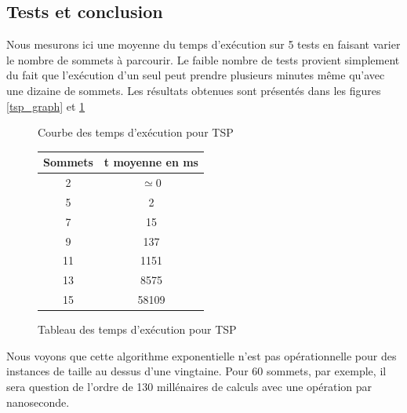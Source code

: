  

\subsection{Tests et conclusion}
Nous mesurons ici une moyenne du temps d'exécution sur 5 tests en faisant varier le nombre de sommets à parcourir. Le faible nombre de tests provient simplement du fait que l'exécution d'un seul peut prendre plusieurs minutes même qu'avec une dizaine de sommets. Les résultats obtenues sont présentés dans les figures \ref{tsp_graph} et \ref{tsp_table}

\begin{figure}[ht]
\begin{minipage}[b]{0.5\linewidth}
\centering
{}
\caption {Courbe des temps d'exécution pour TSP}
\label{tsp_graph}
\end{minipage}
\hspace{0.5cm}
\begin{minipage}[b]{0.5\linewidth}
\centering
\begin{tabular}{|c|c|}
\hline
Sommets & t moyenne en ms\\
\hline
2 & $\simeq 0$\\
\hline
5 & 2\\
\hline
7 & 15\\
\hline
9 & 137\\
\hline
11 & 1151\\
\hline
13 & 8575\\
\hline
15 & 58109\\
\hline
\end{tabular}
\caption {Tableau des temps d'exécution pour TSP}
\label{tsp_table}
\end{minipage}
\end{figure}

Nous voyons que cette algorithme exponentielle n'est pas opérationnelle pour des instances de taille au dessus d'une vingtaine. Pour 60 sommets, par exemple, il sera question de l'ordre de 130 millénaires de calculs avec une opération par nanoseconde. 

